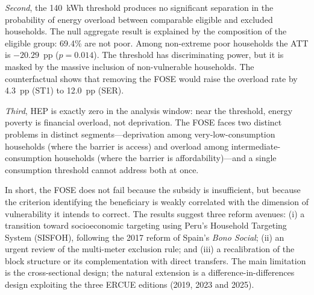 \documentclass[11pt,a4paper]{article}
\begin{document}
\textit{Second}, the 140~kWh threshold produces no significant separation in
the probability of energy overload between comparable eligible and excluded
households. The null aggregate result is explained by the composition of the
eligible group: 69.4\% are not poor. Among non-extreme poor households the ATT
is $-20.29$~pp ($p=0.014$). The threshold has discriminating power, but it is
masked by the massive inclusion of non-vulnerable households. The
counterfactual shows that removing the FOSE would raise the overload rate by
4.3~pp (ST1) to 12.0~pp (SER).

\textit{Third}, HEP is exactly zero in the analysis window: near the threshold,
energy poverty is financial overload, not deprivation. The FOSE faces two
distinct problems in distinct segments---deprivation among very-low-consumption
households (where the barrier is access) and overload among
intermediate-consumption households (where the barrier is affordability)---and
a single consumption threshold cannot address both at once.

In short, the FOSE does not fail because the subsidy is insufficient, but
because the criterion identifying the beneficiary is weakly correlated with the
dimension of vulnerability it intends to correct. The results suggest three
reform avenues: (i) a transition toward socioeconomic targeting using Peru's
Household Targeting System (SISFOH), following the 2017 reform of Spain's
\textit{Bono Social}; (ii) an urgent review of the multi-meter exclusion rule;
and (iii) a recalibration of the block structure or its complementation with
direct transfers. The main limitation is the cross-sectional design; the
natural extension is a difference-in-differences design exploiting the three
ERCUE editions (2019, 2023 and 2025).
\end{document}

